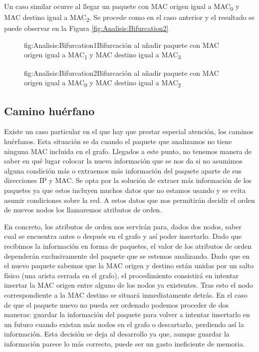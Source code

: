 \documentclass[tfg,epsbased,lof,lot,loa,final,nocopyright,overleaf]{tfgtfmthesisuam}
\begin{document}
Un caso similar ocurre al llegar un paquete con MAC origen igual a MAC\textsubscript{0} y MAC destino igual a MAC\textsubscript{2}. Se procede como en el caso anterior y el resultado se puede observar en la Figura \ref{fig:Analisis:Bifurcation2}

\begin{figure}[Ejemplo de bifurcación 1]{fig:Analisis:Bifurcation1}{Bifurcación al añadir paquete con MAC origen igual a MAC\textsubscript{1} y MAC destino igual a MAC\textsubscript{3}}
    
\end{figure}

\begin{figure}[Ejemplo de bifurcación 2]{fig:Analisis:Bifurcation2}{Bifurcación al añadir paquete con MAC origen igual a MAC\textsubscript{0} y MAC destino igual a MAC\textsubscript{2}}
    
\end{figure}

\subsection{Camino huérfano}
\label{subsec:Analisis:Reconstruccion:Huerfano}
Existe un caso particular en el que hay que prestar especial atención, los caminos huérfanos. Esta situación se da cuando el paquete que analizamos no tiene ninguna MAC incluida en el grafo. Llegados a este punto, no tenemos manera de saber en qué lugar colocar la nueva información que se nos da si no asumimos alguna condición más o extraemos más información del paquete aparte de sus direcciones IP y MAC. Se opta por la solución de extraer más información de los paquetes ya que estos incluyen muchos datos que no estamos usando y se evita asumir condiciones sobre la red. A estos datos que nos permitirán decidir el orden de nuevos nodos los llamaremos atributos de orden.

En concreto, los atributos de orden nos servirán para, dados dos nodos, saber cual se encuentra antes o después en el grafo y así poder insertarlo. Dado que recibimos la información en forma de paquetes, el valor de los atributos de orden dependerán exclusivamente del paquete que se estemos analizando. Dado que en el nuevo paquete sabemos que la MAC origen y destino están unidas por un salto físico (una arista cerrada en el grafo), el procedimiento consistirá en intentar insertar la MAC origen entre alguno de los nodos ya existentes. Tras esto el nodo correspondiente a la MAC destino se situará inmediatamente detrás. En el caso de que el paquete nuevo no pueda ser ordenado podemos proceder de dos maneras: guardar la información del paquete para volver a intentar insertarlo en un futuro cuando existan más nodos en el grafo o descartarlo, perdiendo así la información. Esta decisión se deja al desarrollo ya que, aunque guardar la información parece lo más correcto, puede ser un gasto ineficiente de memoria.
\end{document}
